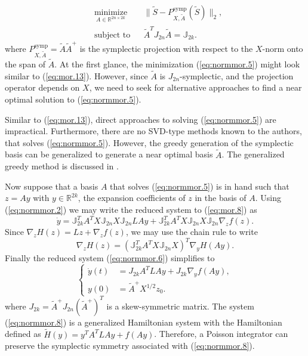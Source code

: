 \begin{equation} \label{eq:normmor.5}
\begin{aligned}
& \underset{A\in \mathbb{R}^{2n\times 2k}}{\text{minimize}}
& & \| \tilde S - P^\text{symp}_{X,\tilde A}(\tilde S) \|_2, \\
& \text{subject to}
& & \tilde A^T J_{2n} \tilde A = \mathbb J_{2k}.
\end{aligned}
\end{equation}
where $P^\text{symp}_{X,\tilde A} = \tilde A \tilde A^+$ is the symplectic projection with respect to the $X$-norm onto the span of $\tilde A$. At the first glance, the minimization (\ref{eq:normmor.5}) might look similar to (\ref{eq:mor.13}). However, since $\tilde A$ is $J_{2n}$-symplectic, and the projection operator depends on $X$, we need to seek for alternative approaches to find a near optimal solution to (\ref{eq:normmor.5}). 

Similar to (\ref{eq:mor.13}), direct approaches to solving (\ref{eq:normmor.5}) are impractical. Furthermore, there are no SVD-type methods known to the authors, that solves (\ref{eq:normmor.5}). However, the greedy generation of the symplectic basis can be generalized to generate a near optimal basis $\tilde A$. The generalized greedy method is discussed in .

Now suppose that a basis $A$ that solves (\ref{eq:normmor.5}) is in hand such that $z = Ay$ with $y\in \mathbb R^{2k}$, the expansion coefficients of $z$ in the basis of $A$. Using (\ref{eq:normmor.2}) we may write the reduced system to (\ref{eq:mor.8}) as
\begin{equation} \label{eq:normmor.6}
	\dot y = \mathbb J_{2k}^T A^T X \mathbb J_{2n} X \mathbb{J}_{2n} LAy + \mathbb J_{2k}^T A^T X \mathbb J_{2n} X \mathbb{J}_{2n} \nabla_z f(z).
\end{equation}
Since $\nabla_z H(z) = Lz + \nabla_z f(z)$, we may use the chain rule to write
\begin{equation} \label{eq:normmor.7}
	\nabla_z H(z) = ( \mathbb J_{2k}^T A^T X \mathbb J_{2n} X )^T \nabla_y H(Ay).
\end{equation}
Finally the reduced system (\ref{eq:normmor.6}) simplifies to
\begin{equation} \label{eq:normmor.8}
\left\{
\begin{aligned}
	\dot y(t) &= J_{2k} A^T L A y + J_{2k} \nabla_y f(Ay), \\
	y(0) &= \tilde A^+ X^{1/2} z_0.
\end{aligned}
\right.
\end{equation}
where $J_{2k}=\tilde A^+ J_{2n} (\tilde A^+)^T$ is a skew-symmetric matrix. The system (\ref{eq:normmor.8}) is a generalized Hamiltonian system with the Hamiltonian defined as $\tilde H(y) = y^TA^TLAy + f(Ay)$. Therefore, a Poisson integrator can preserve the symplectic symmetry associated with (\ref{eq:normmor.8}). 


